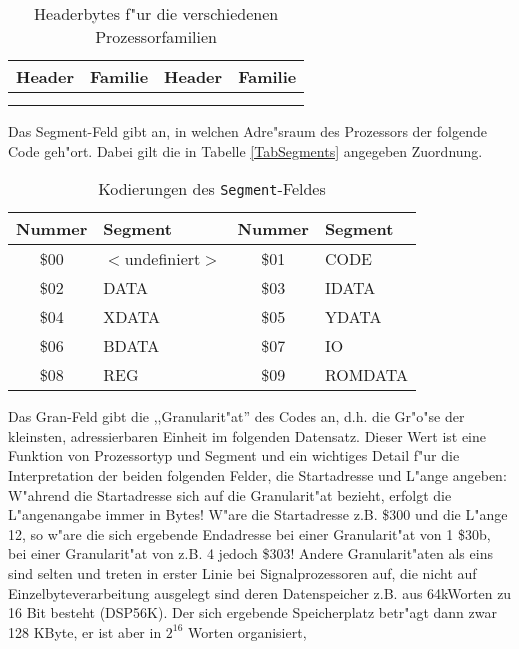 \documentclass[12pt,a4paper,twoside]{report}
\begin{document}
\begin{center}\begin{longtable}{|c|l||c|l|}
\hline
Header & Familie & Header & Familie \\
\hline
\hline
\endhead

\\ \hline
\caption{Headerbytes f"ur die verschiedenen Prozessorfamilien}
\label{TabHeader}
\end{longtable}\end{center}

Das Segment-Feld gibt an, in welchen Adre"sraum des Prozessors der
folgende Code geh"ort.  Dabei gilt die in Tabelle \ref{TabSegments}
angegeben Zuordnung.
\begin{table*}[htbp]
\begin{center}\begin{tabular}{|c|l||c|l|}
\hline
Nummer & Segment & Nummer & Segment \\
\hline
\hline
\$00 &    $<$undefiniert$>$    & \$01 &    CODE \\
\$02 &    DATA                 & \$03 &    IDATA \\
\$04 &    XDATA                & \$05 &    YDATA \\
\$06 &    BDATA                & \$07 &    IO \\
\$08 &    REG                  & \$09 &    ROMDATA \\
\hline
\end{tabular}\end{center}
\caption{Kodierungen des {\tt Segment}-Feldes\label{TabSegments}
         \label{TabSegmentNums}}
\end{table*}
Das Gran-Feld gibt die ,,Granularit"at'' des Codes an, d.h. die Gr"o"se
der kleinsten, adressierbaren Einheit im folgenden Datensatz.  Dieser
Wert ist eine Funktion von Prozessortyp und Segment und ein wichtiges
Detail f"ur die Interpretation der beiden folgenden Felder, die
Startadresse und L"ange angeben: W"ahrend die Startadresse sich auf die
Granularit"at bezieht, erfolgt die L"angenangabe immer in Bytes!  W"are
die Startadresse z.B. \$300 und die L"ange 12, so w"are die sich
ergebende Endadresse bei einer Granularit"at von 1 \$30b, bei einer
Granularit"at von z.B. 4 jedoch \$303!  Andere Granularit"aten als eins
sind selten und treten in erster Linie bei Signalprozessoren auf, die
nicht  auf Einzelbyteverarbeitung ausgelegt sind deren Datenspeicher z.B.
aus 64kWorten zu 16 Bit besteht (DSP56K).  Der sich ergebende Speicherplatz
betr"agt dann zwar 128 KByte, er ist aber in $2^{16}$ Worten organisiert,
\end{document}
